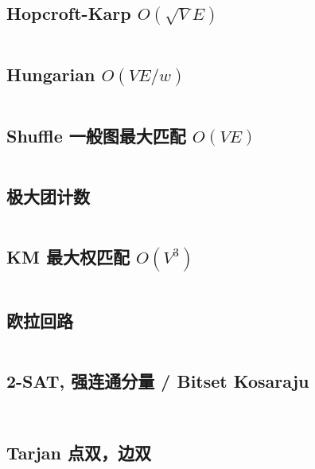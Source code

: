 \documentclass[titlepage, a4paper, 11pt]{article}
\begin{document}
\begin{spacing}{1.15}
				\subsection{Hopcroft-Karp $O(\sqrt{V} E)$}
					\inputminted[highlightlines={5,9}]{cpp}{src/TreeandGraph/hk_skip2004.cpp}
				\subsection{Hungarian $O(V E / w)$}
					\inputminted{cpp}{src/TreeandGraph/Hungarian.cpp}
				\subsection{Shuffle 一般图最大匹配 $O(V E)$}
					\inputminted{cpp}{src/TreeandGraph/一般图最大匹配-shuffle.cpp}
				\subsection{极大团计数}
					\inputminted{cpp}{src/TreeandGraph/CliqueCount.cpp}
				\subsection{KM 最大权匹配 $O(V^3)$}
					\inputminted{cpp}{src/TreeandGraph/KM.cpp}
				\subsection{欧拉回路}
				\inputminted{cpp}{src/TreeandGraph/欧拉回路.cpp}
				\subsection{2-SAT, 强连通分量 / Bitset Kosaraju}
					\inputminted{cpp}{src/TreeandGraph/2-sat.cpp}
					\inputminted{cpp}{src/TreeandGraph/kosaraju.cpp}
				\subsection{Tarjan 点双，边双}
					\inputminted{cpp}{src/TreeandGraph/Tarjan.cpp}

\end{spacing}
\end{document}

